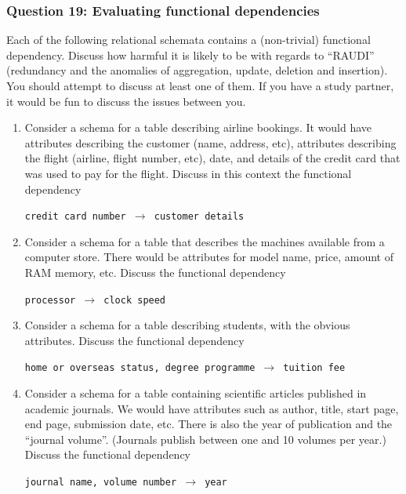 \subsubsection{Question 19: Evaluating functional dependencies}

Each of the following relational schemata contains a (non-trivial) functional dependency. Discuss how harmful
it is likely to be with regards to ``RAUDI'' (redundancy and the anomalies of aggregation, update, deletion and
insertion). You should attempt to discuss at least one of them. If you have a study partner, it would be fun to
discuss the issues between you.

\begin{enumerate}[label=\alph*.]
  \item Consider a schema for a table describing airline bookings. It would have attributes describing the customer
  (name, address, etc), attributes describing the flight (airline, flight number, etc), date, and details of the credit
  card that was used to pay for the flight. Discuss in this context the functional dependency

  \texttt{credit card number $\rightarrow$ customer details}

  \item Consider a schema for a table that describes the machines available from a computer store. There would be
  attributes for model name, price, amount of RAM memory, etc. Discuss the functional dependency

  \texttt{processor $\rightarrow$ clock speed}

  \item Consider a schema for a table describing students, with the obvious attributes. Discuss the functional dependency

  \texttt{home or overseas status, degree programme $\rightarrow$ tuition fee}

  \item Consider a schema for a table containing scientific articles published in academic journals. We would have
  attributes such as author, title, start page, end page, submission date, etc. There is also the year of publication
  and the “journal volume”. (Journals publish between one and 10 volumes per year.) Discuss the functional
  dependency

  \texttt{journal name, volume number $\rightarrow$ year}
\end{enumerate}

